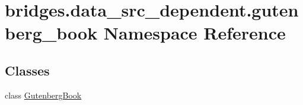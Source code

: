 \hypertarget{namespacebridges_1_1data__src__dependent_1_1gutenberg__book}{}\section{bridges.\+data\+\_\+src\+\_\+dependent.\+gutenberg\+\_\+book Namespace Reference}
\label{namespacebridges_1_1data__src__dependent_1_1gutenberg__book}
\subsection*{Classes}
\begin{DoxyCompactItemize}
\item 
class \mbox{\hyperlink{classbridges_1_1data__src__dependent_1_1gutenberg__book_1_1_gutenberg_book}{Gutenberg\+Book}}
\end{DoxyCompactItemize}
